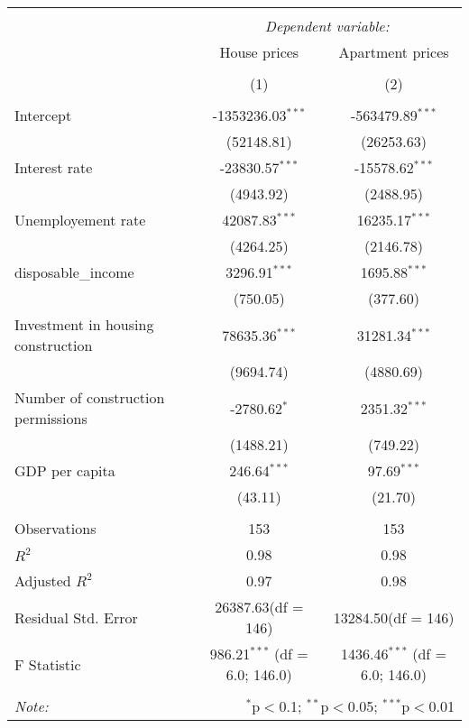 \begin{table}[!htbp] \centering
\begin{tabular}{@{\extracolsep{5pt}}lcc}
\\[-1.8ex]\hline
\hline \\[-1.8ex]
& \multicolumn{2}{c}{\textit{Dependent variable:}} \
\cr \cline{2-3}
\\[-1.8ex] & \multicolumn{1}{c}{House prices} & \multicolumn{1}{c}{Apartment prices}  \\
\\[-1.8ex] & (1) & (2) \\
\hline \\[-1.8ex]
 Intercept & -1353236.03$^{***}$ & -563479.89$^{***}$ \\
  & (52148.81) & (26253.63) \\
 Interest rate & -23830.57$^{***}$ & -15578.62$^{***}$ \\
  & (4943.92) & (2488.95) \\
 Unemployement rate & 42087.83$^{***}$ & 16235.17$^{***}$ \\
  & (4264.25) & (2146.78) \\
 disposable_income & 3296.91$^{***}$ & 1695.88$^{***}$ \\
  & (750.05) & (377.60) \\
 Investment in housing construction & 78635.36$^{***}$ & 31281.34$^{***}$ \\
  & (9694.74) & (4880.69) \\
 Number of construction permissions & -2780.62$^{*}$ & 2351.32$^{***}$ \\
  & (1488.21) & (749.22) \\
 GDP per capita & 246.64$^{***}$ & 97.69$^{***}$ \\
  & (43.11) & (21.70) \\
\hline \\[-1.8ex]
 Observations & 153 & 153 \\
 $R^2$ & 0.98 & 0.98 \\
 Adjusted $R^2$ & 0.97 & 0.98 \\
 Residual Std. Error & 26387.63(df = 146) & 13284.50(df = 146)  \\
 F Statistic & 986.21$^{***}$ (df = 6.0; 146.0) & 1436.46$^{***}$ (df = 6.0; 146.0) \\
\hline
\hline \\[-1.8ex]
\textit{Note:} & \multicolumn{2}{r}{$^{*}$p$<$0.1; $^{**}$p$<$0.05; $^{***}$p$<$0.01} \\
\end{tabular}
\end{table}